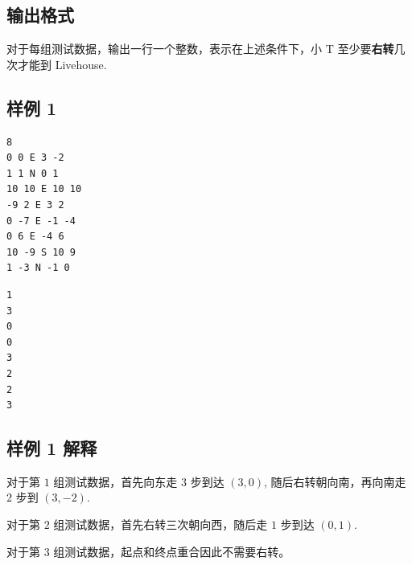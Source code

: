\subsection{输出格式}

对于每组测试数据，输出一行一个整数，表示在上述条件下，小 T 至少要\textbf{右转}几次才能到 Livehouse.

\subsection{样例 1}

\begin{minipage}{\linewidth}
   \begin{minipage}[t]{0.49\linewidth}
      \begin{lstlisting}[title=\texttt{standard input}]
8
0 0 E 3 -2
1 1 N 0 1
10 10 E 10 10
-9 2 E 3 2
0 -7 E -1 -4
0 6 E -4 6
10 -9 S 10 9
1 -3 N -1 0
\end{lstlisting}
   \end{minipage}
   \begin{minipage}[t]{0.49\linewidth}
      \begin{lstlisting}[title=\texttt{standard output}]
1
3
0
0
3
2
2
3
\end{lstlisting}
   \end{minipage}
\end{minipage}

\subsection{样例 1 解释}

对于第 $1$ 组测试数据，首先向东走 $3$ 步到达 $(3,0)$, 随后右转朝向南，再向南走 $2$ 步到 $(3, -2)$.

对于第 $2$ 组测试数据，首先右转三次朝向西，随后走 $1$ 步到达 $(0, 1)$.

对于第 $3$ 组测试数据，起点和终点重合因此不需要右转。